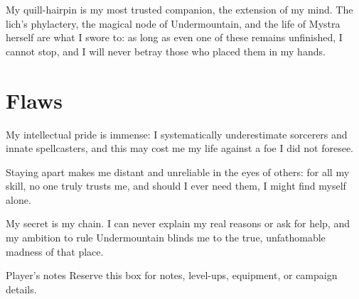 \documentclass[letterpaper,twocolumn,openany,nodeprecatedcode,justified]{dndbook}
\begin{document}
My quill-hairpin is my most trusted companion, the extension of my mind.
The lich's phylactery, the magical node of Undermountain, and the life of
Mystra herself are what I swore to: as long as even one of these remains
unfinished, I cannot stop, and I will never betray those who placed them
in my hands.

\section{Flaws}
My intellectual pride is immense: I systematically underestimate
sorcerers and innate spellcasters, and this may cost me my life against a
foe I did not foresee.

Staying apart makes me distant and unreliable in the eyes of others: for
all my skill, no one truly trusts me, and should I ever need them, I
might find myself alone.

My secret is my chain. I can never explain my real reasons or ask for
help, and my ambition to rule Undermountain blinds me to the true,
unfathomable madness of that place.

\begin{DndComment}{Player's notes}
Reserve this box for notes, level-ups, equipment, or campaign details.
\end{DndComment}
\end{document}
